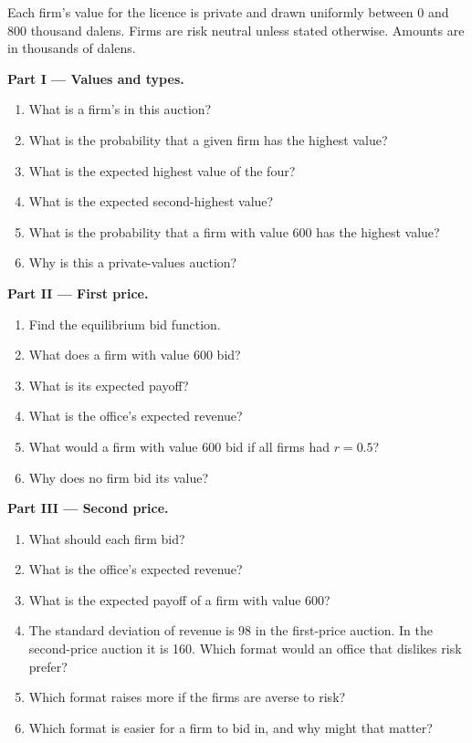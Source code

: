 \begin{problem}
\label{pb:b2:bayesian-games:1}
Each firm's value for the licence is private and drawn uniformly between 0 and 800 thousand dalens. Firms are risk
neutral unless stated otherwise. Amounts are in thousands of dalens.

\medskip
\noindent\textbf{Part I --- Values and types.}
\begin{enumerate}
  \item What is a firm's  in this auction?
  \item What is the probability that a given firm has the highest value?
  \item What is the expected highest value of the four?
  \item What is the expected second-highest value?
  \item What is the probability that a firm with value 600 has the highest value?
  \item Why is this a private-values auction?
\end{enumerate}

\medskip
\noindent\textbf{Part II --- First price.}
\begin{enumerate}[resume]
  \item Find the equilibrium bid function.
  \item What does a firm with value 600 bid?
  \item What is its expected payoff?
  \item What is the office's expected revenue?
  \item What would a firm with value 600 bid if all firms had  $r = 0.5$?
  \item Why does no firm bid its value?
\end{enumerate}

\medskip
\noindent\textbf{Part III --- Second price.}
\begin{enumerate}[resume]
  \item What should each firm bid?
  \item What is the office's expected revenue?
  \item What is the expected payoff of a firm with value 600?
  \item The standard deviation of revenue is 98 in the first-price auction. In the second-price auction it is 160.
    Which format would an office that dislikes risk prefer?
  \item Which format raises more if the firms are averse to risk?
  \item Which format is easier for a firm to bid in, and why might that matter?
\end{enumerate}


\end{problem}
